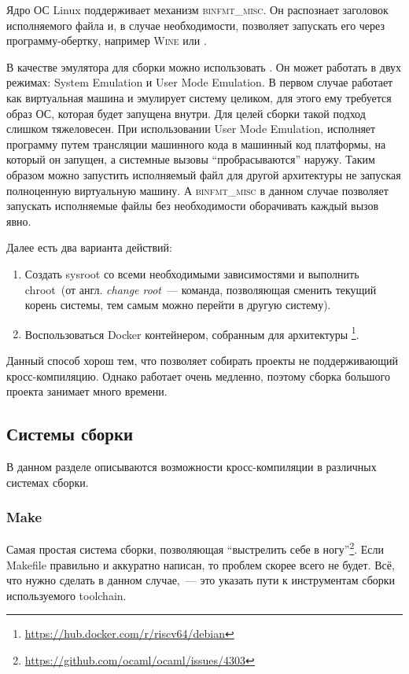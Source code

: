 Ядро ОС Linux поддерживает механизм \textsc{binfmt\_misc}.
Он распознает заголовок исполняемого файла и, в случае необходимости, позволяет запускать его через программу-обертку, например \textsc{Wine} или \qemu{}.

В качестве эмулятора для сборки можно использовать \qemu{}.
Он может работать в двух режимах: System Emulation и User Mode Emulation.
В первом случае \qemu{} работает как виртуальная машина и эмулирует систему целиком, для этого ему требуется образ ОС, которая будет запущена внутри.
Для целей сборки такой подход слишком тяжеловесен.
При использовании User Mode Emulation, \qemu{} исполняет программу путем трансляции машинного кода в машинный код платформы, на который он запущен, а системные вызовы \enquote{пробрасываются} наружу.
Таким образом можно запустить исполняемый файл для другой архитектуры не запуская полноценную виртуальную машину.
А \textsc{binfmt\_misc} в данном случае позволяет запускать исполняемые файлы без необходимости оборачивать каждый вызов явно.

Далее есть два варианта действий:
\begin{enumerate}
	\item Создать sysroot со всеми необходимыми зависимостями и выполнить chroot~(от англ. \textit{change root}~--- команда, позволяющая сменить текущий корень системы, тем самым можно перейти в другую систему).
	\item Воспользоваться Docker контейнером, собранным для архитектуры \riscv{}\footnote{\url{https://hub.docker.com/r/riscv64/debian}}.
\end{enumerate}

Данный способ хорош тем, что позволяет собирать проекты не поддерживающий кросс-компиляцию.
Однако \qemu{} работает очень медленно, поэтому сборка большого проекта занимает много времени.

\subsection{Системы сборки}
\label{subsec:build_systems}

В данном разделе описываются возможности кросс-компиляции в различных системах сборки.

\subsubsection{Make}

Самая простая система сборки, позволяющая \enquote{выстрелить себе в ногу}\footnote{\url{https://github.com/ocaml/ocaml/issues/4303}}.
Если Makefile правильно и аккуратно написан, то проблем скорее всего не будет.
Всё, что нужно сделать в данном случае,~--- это указать пути к инструментам сборки используемого toolchain.

